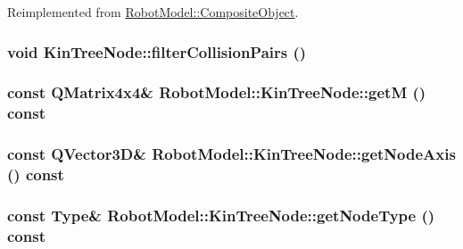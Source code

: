 Reimplemented from \hyperlink{class_robot_model_1_1_composite_object_ad33452f1246939d366ffbf02d1022a91}{RobotModel::CompositeObject}.\hypertarget{class_robot_model_1_1_kin_tree_node_a51113339b5ffc471c058218f1294d73a}{
\subsubsection[{filterCollisionPairs}]{\setlength{\rightskip}{0pt plus 5cm}void KinTreeNode::filterCollisionPairs ()}}
\label{class_robot_model_1_1_kin_tree_node_a51113339b5ffc471c058218f1294d73a}
\hypertarget{class_robot_model_1_1_kin_tree_node_a5c91c678cc74412ec298e61a39b47e3e}{
\subsubsection[{getM}]{\setlength{\rightskip}{0pt plus 5cm}const QMatrix4x4\& RobotModel::KinTreeNode::getM () const}}
\label{class_robot_model_1_1_kin_tree_node_a5c91c678cc74412ec298e61a39b47e3e}
\hypertarget{class_robot_model_1_1_kin_tree_node_af6a4b3bd148bf6aba766c367e13d59b6}{
\subsubsection[{getNodeAxis}]{\setlength{\rightskip}{0pt plus 5cm}const QVector3D\& RobotModel::KinTreeNode::getNodeAxis () const}}
\label{class_robot_model_1_1_kin_tree_node_af6a4b3bd148bf6aba766c367e13d59b6}
\hypertarget{class_robot_model_1_1_kin_tree_node_aac3f58f3a0535b2983e2b328d9eee65a}{
\subsubsection[{getNodeType}]{\setlength{\rightskip}{0pt plus 5cm}const {\bf Type}\& RobotModel::KinTreeNode::getNodeType () const}}
